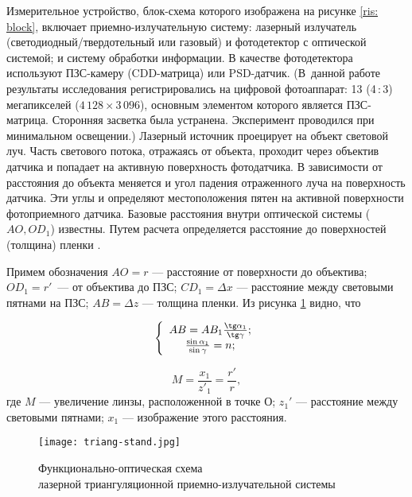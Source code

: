 Измерительное устройство, блок-схема которого изображена на рисунке \ref{ris: block}, включает приемно-излучательную систему: лазерный излучатель (светодиодный/твердотельный или газовый) и фотодетектор с оптической системой; и систему обработки информации. В качестве фотодетектора используют ПЗС-камеру (CDD-матрица) или PSD-датчик. (В~данной работе результаты исследования регистрировались на цифровой фотоаппарат: 13 (4\,:\,3) мегапикселей ($4\,128 \times 3\,096$), основным элементом которого является ПЗС-матрица. Сторонняя засветка была устранена. Эксперимент проводился при минимальном освещении.) Лазерный источник проецирует на объект световой луч. Часть светового потока, отражаясь от объекта, проходит через объектив датчика и попадает на активную поверхность фотодатчика. В зависимости от расстояния до объекта меняется и угол падения отраженного луча на поверхность датчика. Эти углы и определяют местоположения пятен на активной поверхности фотоприемного датчика. Базовые расстояния внутри оптической системы ($AO,OD_1$) известны. Путем расчета определяется расстояние до поверхностей (толщина) пленки \cite{johnson, barishnikov}.


Примем обозначения $AO=r$ --- расстояние от поверхности до объектива; $OD_1=r'$~--- от объектива до ПЗС; $CD_1=\Delta x$ --- расстояние между световыми пятнами на ПЗС; $AB=\Delta z$ --- толщина пленки.
Из рисунка \ref{ris:triang-stand} видно, что

\begin{equation}
\left\{
\begin{array}{ccc}
AB=AB_1\frac{\tg\alpha_1}{\tg\gamma};\\
\frac{\sin\alpha_1}{\sin\gamma}=n;
\end{array}
\right.
\end{equation}

\begin{equation}
M = \frac{x_1}{z'_1}=\frac{r'}{r},
\end{equation}
где $M$ --- увеличение линзы, расположенной в точке О; $z_1'$ --- расстояние между световыми пятнами;  $x_1$ --- изображение этого расстояния.

\begin{figure}[h!]
\begin{center}
\texttt{[image: triang-stand.jpg]}
\end{center}
\caption{Функционально-оптическая схема\\ лазерной триангуляционной приемно-излучательной системы}
\label{ris:triang-stand}
\end{figure}

